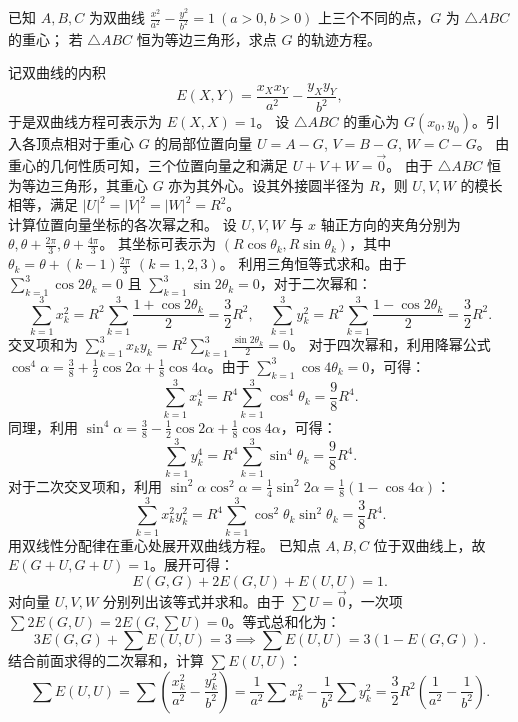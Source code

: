 \begin{example}
已知 $A, B, C$ 为双曲线 \(\frac{x^2}{a^2} - \frac{y^2}{b^2} = 1\ (a > 0, b > 0)\) 上三个不同的点，\(G\) 为 \(\triangle ABC\) 的重心； 若 \(\triangle ABC\) 恒为等边三角形，求点 \(G\) 的轨迹方程。
\end{example}
\begin{solution}
记双曲线的内积
\[ E(X, Y) = \frac{x_X x_Y}{a^2} - \frac{y_X y_Y}{b^2}, \]
于是双曲线方程可表示为 $E(X, X) = 1$。
设 $\triangle ABC$ 的重心为 $G(x_0, y_0)$。引入各顶点相对于重心 $G$ 的局部位置向量 $U = A - G$, $V = B - G$, $W = C - G$。
由重心的几何性质可知，三个位置向量之和满足 $U + V + W = \vec{0}$。
由于 $\triangle ABC$ 恒为等边三角形，其重心 $G$ 亦为其外心。设其外接圆半径为 $R$，则 $U, V, W$ 的模长相等，满足 $|U|^2 = |V|^2 = |W|^2 = R^2$。\\
计算位置向量坐标的各次幂之和。
设 $U, V, W$ 与 $x$ 轴正方向的夹角分别为 $\theta, \theta + \frac{2\pi}{3}, \theta + \frac{4\pi}{3}$。
其坐标可表示为 $(R\cos\theta_k, R\sin\theta_k)$，其中 $\theta_k = \theta + (k-1)\frac{2\pi}{3}$ $(k=1,2,3)$。
利用三角恒等式求和。由于 $\sum_{k=1}^3 \cos 2\theta_k = 0$ 且 $\sum_{k=1}^3 \sin 2\theta_k = 0$，对于二次幂和：
\[ \sum_{k=1}^3 x_k^2 = R^2 \sum_{k=1}^3 \frac{1 + \cos 2\theta_k}{2} = \frac{3}{2}R^2, \quad \sum_{k=1}^3 y_k^2 = R^2 \sum_{k=1}^3 \frac{1 - \cos 2\theta_k}{2} = \frac{3}{2}R^2. \]
交叉项和为 $\sum_{k=1}^3 x_k y_k = R^2 \sum_{k=1}^3 \frac{\sin 2\theta_k}{2} = 0$。
对于四次幂和，利用降幂公式 $\cos^4\alpha = \frac{3}{8} + \frac{1}{2}\cos 2\alpha + \frac{1}{8}\cos 4\alpha$。由于 $\sum_{k=1}^3 \cos 4\theta_k = 0$，可得：
\[ \sum_{k=1}^3 x_k^4 = R^4 \sum_{k=1}^3 \cos^4\theta_k = \frac{9}{8}R^4. \]
同理，利用 $\sin^4\alpha = \frac{3}{8} - \frac{1}{2}\cos 2\alpha + \frac{1}{8}\cos 4\alpha$，可得：
\[ \sum_{k=1}^3 y_k^4 = R^4 \sum_{k=1}^3 \sin^4\theta_k = \frac{9}{8}R^4. \]
对于二次交叉项和，利用 $\sin^2\alpha \cos^2\alpha = \frac{1}{4}\sin^2 2\alpha = \frac{1}{8}(1 - \cos 4\alpha)$：
\[ \sum_{k=1}^3 x_k^2 y_k^2 = R^4 \sum_{k=1}^3 \cos^2\theta_k \sin^2\theta_k = \frac{3}{8}R^4. \]
用双线性分配律在重心处展开双曲线方程。
已知点 $A, B, C$ 位于双曲线上，故 $E(G+U, G+U) = 1$。展开可得：
\[ E(G, G) + 2E(G, U) + E(U, U) = 1. \]
对向量 $U, V, W$ 分别列出该等式并求和。由于 $\sum U = \vec{0}$，一次项 $\sum 2E(G, U) = 2E\left(G, \sum U\right) = 0$。等式总和化为：
\[ 3E(G, G) + \sum E(U, U) = 3 \implies \sum E(U, U) = 3(1 - E(G, G)). \]
结合前面求得的二次幂和，计算 $\sum E(U, U)$：
\[ \sum E(U, U) = \sum \left(\frac{x_k^2}{a^2} - \frac{y_k^2}{b^2}\right) = \frac{1}{a^2}\sum x_k^2 - \frac{1}{b^2}\sum y_k^2 = \frac{3}{2}R^2 \left(\frac{1}{a^2} - \frac{1}{b^2}\right). \]

\end{solution}
